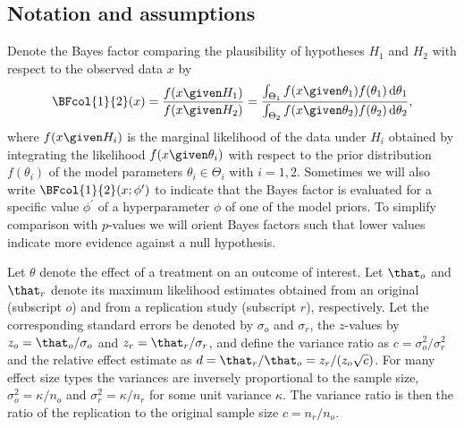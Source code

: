 \subsection*{Notation and assumptions}
Denote the Bayes factor comparing the plausibility of hypotheses $H_1$ and $H_2$
with respect to the observed data $x$ by
\begin{align*}
  \BFcol{1}{2}(x) = \frac{f(x \given H_1)}{f(x \given H_2)}
  = \frac{\int_{\Theta_1} f(x \given \theta_1)f(\theta_1) \, \text{d}\theta_1}{
  \int_{\Theta_2} f(x \given \theta_2)f(\theta_2) \, \text{d}\theta_2},
\end{align*}
where $f(x \given H_i)$ is the marginal likelihood of the data under $H_i$
obtained by integrating the likelihood $f(x \given \theta_{i})$ with respect to
the prior distribution $f(\theta_{i})$ of the model parameters
$\theta_i \in \Theta_i$ with $i = 1, 2$. Sometimes we will also write
$\BFcol{1}{2}(x ; \phi^\prime)$ to indicate that the Bayes factor is evaluated
for a specific value $\phi^\prime$ of a hyperparameter $\phi$ of one of the
model priors. To simplify comparison with $p$-values we will orient Bayes
factors such that lower values indicate more evidence against a null hypothesis.

Let $\theta$ denote the effect of a treatment on an outcome of interest. Let
$\that_o$ and $\that_r$ denote its maximum likelihood estimates obtained from an
original (subscript $o$) and from a replication study (subscript $r$),
respectively. Let the corresponding standard errors be denoted by $\sigma_o$ and
$\sigma_r$, the $z$-values by $z_o = \that_o/\sigma_o$ and
$z_r = \that_r/\sigma_r$, and define the variance ratio as
$c = \sigma_o^2/\sigma_r^2$ and the relative effect estimate as
$d = \that_r/\that_o = z_r/(z_o\sqrt{c})$. For many effect size types the
variances are inversely proportional to the sample size, \ie
$\sigma^2_{o} = \kappa/n_{o}$ and $\sigma^2_{r} = \kappa/n_{r}$ for some unit
variance $\kappa$. The variance ratio is then the ratio of the replication to
the original sample size $c = n_{r}/n_{o}$.

